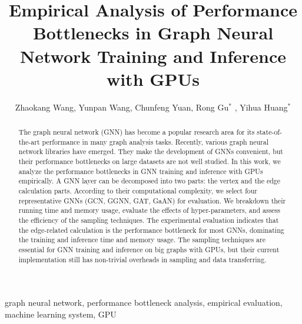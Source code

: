 \documentclass{elsarticle}
\begin{document}
\begin{frontmatter}

	\title{Empirical Analysis of Performance Bottlenecks in Graph Neural Network Training and Inference with GPUs}
    \author{Zhaokang Wang, Yunpan Wang, Chunfeng Yuan, Rong Gu$^*$ , Yihua Huang$^*$ }
	\address{State Key Laboratory for Novel Software Technology, \\Department of Computer Science and Technology, Nanjing University, \\Nanjing 210023, China}

	\begin{abstract}
		The graph neural network (GNN) has become a popular research area for its state-of-the-art performance in many graph analysis tasks.
		Recently, various graph neural network libraries have emerged.
        They make the development of GNNs convenient, but their performance bottlenecks on large datasets are not well studied.
		In this work, we analyze the performance bottlenecks in GNN training and inference with GPUs empirically.
		A GNN layer can be decomposed into two parts: the vertex and the edge calculation parts.
		According to their computational complexity, we select four representative GNNs (GCN, GGNN, GAT, GaAN) for evaluation.
		We breakdown their running time and memory usage, evaluate the effects of hyper-parameters, and assess the efficiency of the sampling techniques.
		The experimental evaluation indicates that the edge-related calculation is the performance bottleneck for most GNNs, dominating the training and inference time and memory usage.
        The sampling techniques are essential for GNN training and inference on big graphs with GPUs, but their current implementation still has non-trivial overheads in sampling and data transferring.
	\end{abstract}

	\begin{keyword}
		graph neural network, performance bottleneck analysis, empirical evaluation, machine learning system, GPU
	\end{keyword}

\end{frontmatter}

\linenumbers










\end{document}

